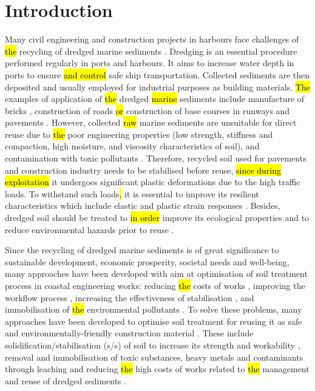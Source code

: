 \documentclass[sustainability,article,submit,pdftex,moreauthors]{Definitions/mdpi}
\begin{document}
\section{Introduction}


Many civil engineering and construction projects in harbours face\hl{ }challenges of \hl{the }recycling of dredged marine sediments \cite{LIM2020110869,Lindh202208,Wangetal2022}. Dredging is an essential procedure performed regularly in ports and harbours. It aims to increase water depth in ports to ensure \hl{and control }safe ship transportation. Collected sediments are then deposited and usually employed for industrial purposes as building materials. \hl{The }examples of application of \hl{the }dredged \hl{marine }sediments include manufacture of bricks \cite{HUSSAIN2022100046,SLIMANOU2020101085}, construction of roads \cite{Wangetal2017} \hl{or} construction of base courses in runways and pavements \cite{Yoobanpot}. However, collected \hl{raw }marine sediments are unsuitable for direct reuse due to \hl{the }poor engineering properties (low strength, stiffness and compaction, high moisture, and viscosity characteristics of soil), and contamination with toxic pollutants \cite{Calmano1986,Pedersen}. Therefore, recycled soil used for pavements and construction industry needs to be stabilised before reuse, \hl{since during exploitation} it undergoes significant plastic deformations due to the high traffic loads. To withstand such loads\hl{,} it is\hl{ }essential to improve its resilient characteristics which include elastic and plastic strain responses \cite{Puppala}. Besides, dredged soil should be treated to \hl{in order }improve its ecological properties and to reduce environmental hazards prior to reuse \cite{CROCETTI202220}. 

Since the recycling of dredged marine sediments is of great significance to sustainable development, economic prosperity, societal needs and well-being, many approaches have been developed with aim at optimisation of soil treatment process in coastal engineering works: reducing \hl{the }costs of works \cite{SVENSSON202230}, improving the workflow process \cite{Grubbetal2008}, increasing the effectiveness of stabilisation \cite{YU2021125568,Dermatas}, and immobilisation of \hl{the }environmental pollutants \cite{Wangetal2021}. To solve these problems, many approaches have been developed to optimise soil treatment for reusing it as safe and environmentally-friendly construction material \cite{Calmano1988}. These include solidification/stabilisation (s/s) of soil to increase its strength and workability \cite{ZHANG2020138551}, removal and immobilisation of toxic substances, heavy metals and contaminants through leaching \cite{SLAMA2021127,Lemenkova202233,ZHANG2021128926,CHI2023131545} and reducing \hl{the }high costs of works related to \hl{the }management and reuse of dredged sediments \cite{Rocha,WANG201869}. 
\end{document}
